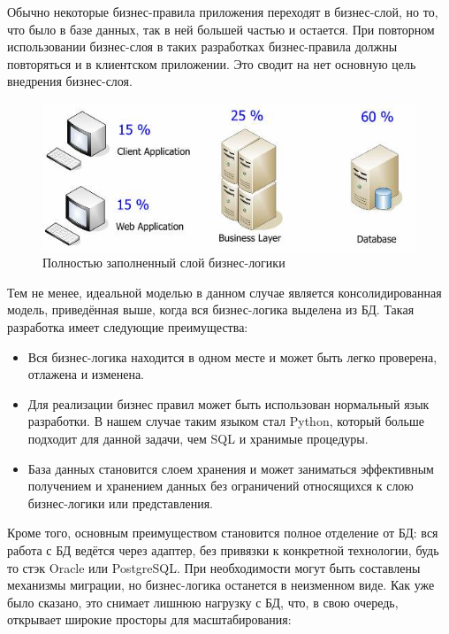 \documentclass[a4paper, 14pt]{extarticle}
\begin{document}
Обычно некоторые бизнес-правила приложения переходят в бизнес-слой, но то, что было в базе данных, так в ней большей частью и остается. При повторном использовании бизнес-слоя в таких разработках бизнес-правила должны повторяться и в клиентском приложении. Это сводит на нет основную цель внедрения бизнес-слоя.

\begin{figure}[!htb]
  \centering
    \includegraphics[scale=0.6]{../shared_images/business-logic/client-server-business-2.jpg}
   \caption{Полностью заполненный слой бизнес-логики}
    \label{fig:start}
\end{figure}

Тем не менее, идеальной моделью в данном случае является консолидированная модель, приведённая выше, когда вся бизнес-логика выделена из БД. Такая разработка имеет следующие преимущества:

\begin{itemize}
  \item Вся бизнес-логика находится в одном месте и может быть легко проверена, отлажена и изменена.
  \item Для реализации бизнес правил может быть использован нормальный язык разработки. В нашем случае таким языком стал Python, который больше подходит для данной задачи, чем SQL и хранимые процедуры.
  \item База данных становится слоем хранения и может заниматься эффективным получением и хранением данных без ограничений относящихся к слою бизнес-логики или представления.
\end{itemize}

Кроме того, основным преимуществом становится полное отделение от БД: вся работа с БД ведётся через адаптер, без привязки к конкретной технологии, будь то стэк Oracle или PostgreSQL. При необходимости могут быть составлены механизмы миграции, но бизнес-логика останется в неизменном виде. Как уже было сказано, это снимает лишнюю нагрузку с БД, что, в свою очередь, открывает широкие просторы для масштабирования:
\end{document}
